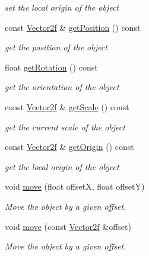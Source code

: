 \begin{DoxyCompactItemize}
\begin{DoxyCompactList}\small\item\em set the local origin of the object \end{DoxyCompactList}\item 
const \hyperlink{classsf_1_1_vector2}{Vector2f} \& \hyperlink{classsf_1_1_transformable_a6a0552d8cf155b7df25f6ceda8ee45a5}{get\+Position} () const 
\begin{DoxyCompactList}\small\item\em get the position of the object \end{DoxyCompactList}\item 
float \hyperlink{classsf_1_1_transformable_ad783a7e9971398ec613d22455252809e}{get\+Rotation} () const 
\begin{DoxyCompactList}\small\item\em get the orientation of the object \end{DoxyCompactList}\item 
const \hyperlink{classsf_1_1_vector2}{Vector2f} \& \hyperlink{classsf_1_1_transformable_a3ea9639abd7a430ac99afb0aaf1ea562}{get\+Scale} () const 
\begin{DoxyCompactList}\small\item\em get the current scale of the object \end{DoxyCompactList}\item 
const \hyperlink{classsf_1_1_vector2}{Vector2f} \& \hyperlink{classsf_1_1_transformable_a6bddc485d22bb64449d9d2d3a99a778f}{get\+Origin} () const 
\begin{DoxyCompactList}\small\item\em get the local origin of the object \end{DoxyCompactList}\item 
void \hyperlink{classsf_1_1_transformable_a86b461d6a941ad390c2ad8b6a4a20391}{move} (float offset\+X, float offset\+Y)
\begin{DoxyCompactList}\small\item\em Move the object by a given offset. \end{DoxyCompactList}\item 
void \hyperlink{classsf_1_1_transformable_ab9ca691522f6ddc1a40406849b87c469}{move} (const \hyperlink{classsf_1_1_vector2}{Vector2f} \&offset)
\begin{DoxyCompactList}\small\item\em Move the object by a given offset. \end{DoxyCompactList}\item 

\end{DoxyCompactItemize}
